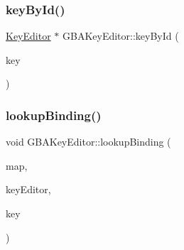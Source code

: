 \subsubsection{\texorpdfstring{key\+By\+Id()}{keyById()}}
{\footnotesize\ttfamily \mbox{\hyperlink{class_q_g_b_a_1_1_key_editor}{Key\+Editor}} $\ast$ G\+B\+A\+Key\+Editor\+::key\+By\+Id (\begin{DoxyParamCaption}\item[{G\+B\+A\+Key}]{key }\end{DoxyParamCaption})\hspace{0.3cm}{\ttfamily [private]}}

\mbox{\label{class_q_g_b_a_1_1_g_b_a_key_editor_a4f0fd55f1a17e0c7bde4a82d244602ce}} 
\subsubsection{\texorpdfstring{lookup\+Binding()}{lookupBinding()}}
{\footnotesize\ttfamily void G\+B\+A\+Key\+Editor\+::lookup\+Binding (\begin{DoxyParamCaption}\item[{const m\+Input\+Map $\ast$}]{map,  }\item[{\mbox{\hyperlink{class_q_g_b_a_1_1_key_editor}{Key\+Editor}} $\ast$}]{key\+Editor,  }\item[{G\+B\+A\+Key}]{key }\end{DoxyParamCaption})\hspace{0.3cm}{\ttfamily [private]}}

